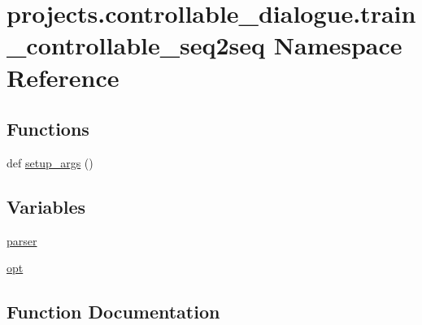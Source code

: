 \hypertarget{namespaceprojects_1_1controllable__dialogue_1_1train__controllable__seq2seq}{}\section{projects.\+controllable\+\_\+dialogue.\+train\+\_\+controllable\+\_\+seq2seq Namespace Reference}
\label{namespaceprojects_1_1controllable__dialogue_1_1train__controllable__seq2seq}
\subsection*{Functions}
\begin{DoxyCompactItemize}
\item 
def \hyperlink{namespaceprojects_1_1controllable__dialogue_1_1train__controllable__seq2seq_a493d97108e1bc85e7dee02310e5303ad}{setup\+\_\+args} ()
\end{DoxyCompactItemize}
\subsection*{Variables}
\begin{DoxyCompactItemize}
\item 
\hyperlink{namespaceprojects_1_1controllable__dialogue_1_1train__controllable__seq2seq_a60db97f9b237238df4976c0cec5152f0}{parser}
\item 
\hyperlink{namespaceprojects_1_1controllable__dialogue_1_1train__controllable__seq2seq_a7c853cd6b318c7e4eb468df8dda5c981}{opt}
\end{DoxyCompactItemize}


\subsection{Function Documentation}
\mbox{\label{namespaceprojects_1_1controllable__dialogue_1_1train__controllable__seq2seq_a493d97108e1bc85e7dee02310e5303ad}} 
